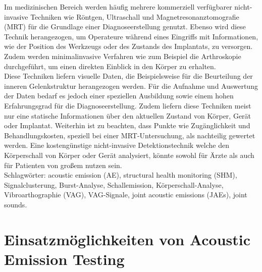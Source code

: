 \documentclass[twoside, 12pt, a4paper]{article}
\begin{document}
	Im medizinischen Bereich werden h\"aufig mehrere kommerziell verf\"ugbarer nicht-invasive Techniken wie R\"ontgen, Ultraschall und Magnetresonanztomografie (MRT) f\"ur die Grundlage einer Diagnoseerstellung genutzt. Ebenso wird diese Technik herangezogen, um Operateure w\"ahrend eines Eingriffs mit Informationen, wie der Position des Werkzeugs oder des Zustands des Implantats, zu versorgen. Zudem werden minimalinvasive Verfahren wie zum Beispiel die  Arthroskopie durchgef\"uhrt, um einen direkten Einblick in den K\"orper zu erhalten.\\
	Diese Techniken liefern visuelle Daten, die Beispielsweise f\"ur die Beurteilung der inneren Gelenkstruktur herangezogen werden. F\"ur die Aufnahme und Auswertung der Daten bedarf es jedoch einer speziellen Ausbildung sowie einem hohen Erfahrungsgrad f\"ur die Diagnoseerstellung. Zudem liefern diese Techniken meist nur eine statische Informationen \"uber den aktuellen Zustand von K\"orper, Ger\"at oder Implantat. Weiterhin ist zu beachten, dass Punkte wie Zug\"anglichkeit und Behandlungskosten, speziell bei einer MRT-Untersuchung, als nachteilig gewertet werden. Eine kosteng\"unstige nicht-invasive Detektionstechnik welche den K\"orperschall von K\"orper oder Ger\"at analysiert, k\"onnte sowohl f\"ur \"Arzte als auch f\"ur Patienten von gro{\ss}em nutzen sein.\cite{Feng.2016}\\
	
	Schlagw\"orter: acoustic emission (AE), structural health monitoring (SHM), Signalclusterung, Burst-Analyse, Schallemission, K\"orperschall-Analyse, Vibroarthographie (VAG), VAG-Signale, joint acoustic emissions (JAEs), joint sounds.   
	
	

	
	\section{Einsatzm\"oglichkeiten von Acoustic Emission Testing}
	
\end{document}
